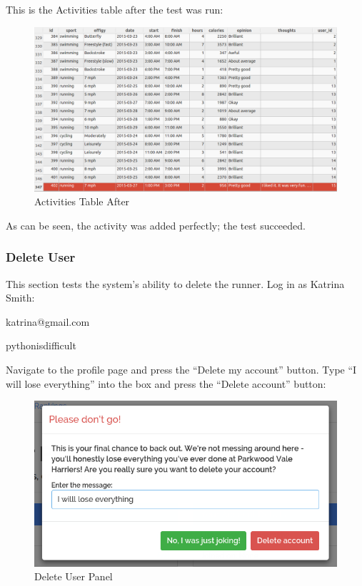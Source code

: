 \documentclass{article}[12pt,a4paper]
\begin{document}
This is the Activities table after the test was run:
\begin{figure}[h!]
    \includegraphics[scale=0.33]{images/testing/add_activity/database_after}
    \caption{Activities Table After}
\end{figure}

As can be seen, the activity was added perfectly; the test succeeded.

\clearpage

\subsubsection{Delete User}
This section tests the system's ability to delete the runner. Log in as Katrina Smith:
\begin{description}[labelindent=1cm]
  \item[Email address:] katrina@gmail.com
  \item[Password:] pythonisdifficult
\end{description}
Navigate to the profile page and press the ``Delete my account'' button. Type ``I will lose everything'' into the box and press the ``Delete account'' button:

\begin{figure}[h!]
    \includegraphics[scale=0.33]{images/testing/delete_user/panel}
    \caption{Delete User Panel}
\end{figure}
\end{document}
